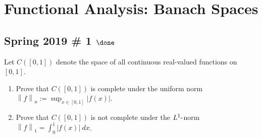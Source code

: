 \hypertarget{functional-analysis-banach-spaces}{%
\section{Functional Analysis: Banach
Spaces}\label{functional-analysis-banach-spaces}}

\hypertarget{spring-2019-1-done}{%
\subsection{\texorpdfstring{Spring 2019 \# 1
\(\done\)}{Spring 2019 \# 1 \textbackslash done}}\label{spring-2019-1-done}}

Let \(C([0, 1])\) denote the space of all continuous real-valued
functions on \([0, 1]\).

\begin{enumerate}
\def\labelenumi{\alph{enumi}.}
\item
  Prove that \(C([0, 1])\) is complete under the uniform norm
  \({\left\lVert {f} \right\rVert}_u := \displaystyle\sup_{x\in [0,1]} |f (x)|\).
\item
  Prove that \(C([0, 1])\) is not complete under the
  \(L^1{\hbox{-}}\)norm
  \({\left\lVert {f} \right\rVert}_1 = \displaystyle\int_0^1 |f (x)| ~dx\).
\end{enumerate}


